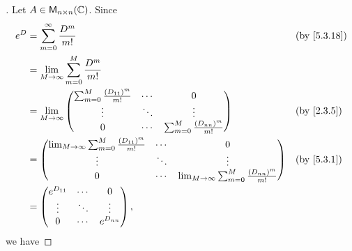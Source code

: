 \begin{proof}[]
  Let \(A \in \mathsf{M}_{{n} \times n}({\mathbb{C}})\).
  Since
  \begin{align*}
    e^D & = \sum_{m = 0}^\infty \frac{D^m}{m!}                                                                                                                     &  & \text{(by \cref{5.3.18})} \\
        & = \lim_{M \to \infty} \sum_{m = 0}^M \frac{D^m}{m!}                                                                                                                                     \\
        & = \lim_{M \to \infty} \begin{pmatrix}
                                  \sum_{m = 0}^M \frac{(D_{1 1})^m}{m!} & \cdots & 0                                     \\
                                  \vdots                                & \ddots & \vdots                                \\
                                  0                                     & \cdots & \sum_{m = 0}^M \frac{(D_{n n})^m}{m!}
                                \end{pmatrix}                                         &  & \text{(by \cref{2.3.5})}                                                     \\
        & = \begin{pmatrix}
              \lim_{M \to \infty} \sum_{m = 0}^M \frac{(D_{1 1})^m}{m!} & \cdots & 0                                                         \\
              \vdots                                                    & \ddots & \vdots                                                    \\
              0                                                         & \cdots & \lim_{M \to \infty} \sum_{m = 0}^M \frac{(D_{n n})^m}{m!}
            \end{pmatrix} &  & \text{(by \cref{5.3.1})}                                 \\
        & = \begin{pmatrix}
              e^{D_{1 1}} & \cdots & 0           \\
              \vdots      & \ddots & \vdots      \\
              0           & \cdots & e^{D_{n n}}
            \end{pmatrix},
  \end{align*}
  we have

\end{proof}
